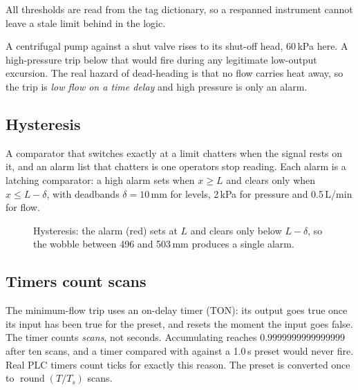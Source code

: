 All thresholds are read from the tag dictionary, so a respanned instrument
cannot leave a stale limit behind in the logic.

\begin{theory}
A centrifugal pump against a shut valve rises to its shut-off head, 60\,kPa
here. A high-pressure trip below that would fire during any legitimate
low-output excursion. The real hazard of dead-heading is that no flow carries
heat away, so the trip is \emph{low flow on a time delay} and high pressure
is only an alarm.
\end{theory}

\subsection{Hysteresis}
A comparator that switches exactly at a limit chatters when the signal rests
on it, and an alarm list that chatters is one operators stop reading. Each
alarm is a latching comparator: a high alarm sets when $x \ge L$ and clears
only when $x \le L - \delta$, with deadbands
$\delta = 10$\,mm for levels, 2\,kPa for pressure and 0.5\,L/min for flow.

\begin{figure}[htbp]
\centering
{}
\caption{Hysteresis: the alarm (red) sets at $L$ and clears only below
$L-\delta$, so the wobble between 496 and 503\,mm produces a single alarm.}
\label{fig:hyst}
\end{figure}

\subsection{Timers count scans}
The minimum-flow trip uses an on-delay timer (TON): its output goes true once
its input has been true for the preset, and resets the moment the input goes
false. The timer counts \emph{scans}, not seconds. Accumulating
 reaches $0.9999999999999999$ after ten scans, and a
timer compared with \code{>=} against a 1.0\,s preset would never fire. Real
PLC timers count ticks for exactly this reason. The preset is converted once
to $\operatorname{round}(T/T_s)$ scans.

